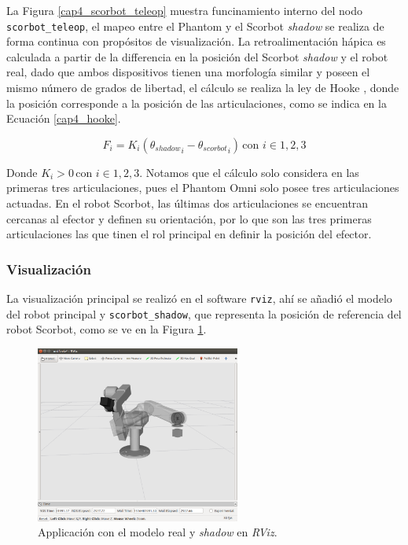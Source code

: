 La Figura \ref{cap4_scorbot_teleop} muestra funcinamiento interno del nodo \texttt{scorbot\_teleop}, el mapeo entre el Phantom y el Scorbot \textit{shadow} se realiza de forma continua con propósitos de visualización. La retroalimentación hápica es calculada a partir de la differencia en la posición del Scorbot \textit{shadow} y el robot real, dado que ambos dispositivos tienen una morfología similar y poseen el mismo número de grados de libertad, el cálculo se realiza la ley de Hooke \cite{handbook}, donde la posición corresponde a la posición de las articulaciones, como se indica en la Ecuación \ref{cap4_hooke}.

\begin{equation}\label{cap4_hooke}
F_i = K_i({\theta_{shadow}}_i - {\theta_{scorbot}}_i) \, \mbox{con } i \in {1,2,3}
\end{equation}

Donde $K_i > 0 \, \mbox{con } i \in {1,2,3}$. Notamos que el cálculo solo considera en las primeras tres articulaciones, pues el Phantom Omni solo posee tres articulaciones actuadas. En el robot Scorbot, las últimas dos articulaciones se encuentran cercanas al efector y definen su orientación, por lo que son las tres primeras articulaciones las que tinen el rol principal en definir la posición del efector.

\subsubsection{Visualización}

La visualización principal se realizó en el software \texttt{rviz}, ahí se añadió el modelo del robot principal y \texttt{scorbot\_shadow}, que representa la posición de referencia del robot Scorbot, como se ve en la Figura \ref{cap4_scorbot_shadow}.

\begin{figure}[H]
  \centering
  \includegraphics[width=0.6\textwidth]{img/cap4/scorbot_shadow.png}
  \caption{Applicación con el modelo real y \textit{shadow} en \textit{RViz}.}
  \label{cap4_scorbot_shadow}
\end{figure}

